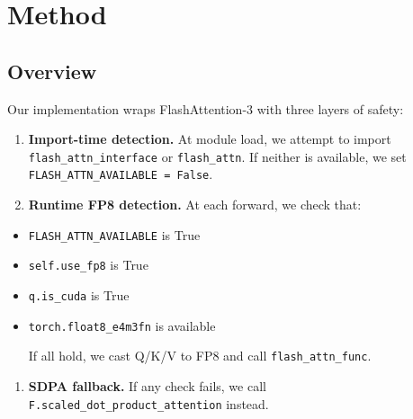 
\section{Method}

\subsection{Overview}

Our implementation wraps FlashAttention-3 with three layers of safety:

\begin{enumerate}
\item \textbf{Import-time detection.} At module load, we attempt to import
  \texttt{flash\_attn\_interface} or \texttt{flash\_attn}. If neither is available, we set
  \texttt{FLASH\_ATTN\_AVAILABLE = False}.

\item \textbf{Runtime FP8 detection.} At each forward, we check that:
\end{enumerate}
\begin{itemize}
\item \texttt{FLASH\_ATTN\_AVAILABLE} is True
\item \texttt{self.use\_fp8} is True
\item \texttt{q.is\_cuda} is True
\item \texttt{torch.float8\_e4m3fn} is available
  
  If all hold, we cast Q/K/V to FP8 and call \texttt{flash\_attn\_func}.

\end{itemize}
\begin{enumerate}
\item \textbf{SDPA fallback.} If any check fails, we call
  \texttt{F.scaled\_dot\_product\_attention} instead.

\end{enumerate}
